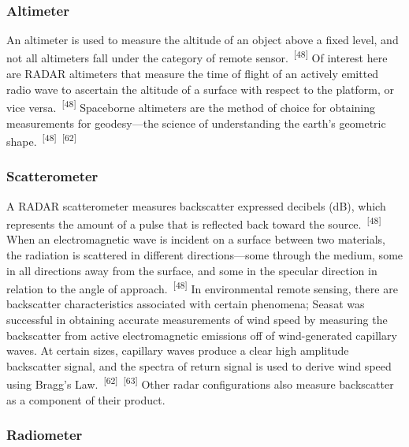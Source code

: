\documentclass{article}
\begin{document}
\subsubsection{Altimeter}


\par{An altimeter is used to measure the altitude of an object above a fixed level, and not all altimeters fall under the category of remote sensor.~\textsuperscript{[48]} Of interest here are RADAR altimeters that measure the time of flight of an actively emitted radio wave to ascertain the altitude of a surface with respect to the platform, or vice versa.~\textsuperscript{[48]} Spaceborne altimeters are the method of choice for obtaining measurements for geodesy---the science of understanding the earth's geometric shape.~\textsuperscript{[48]}~\textsuperscript{[62]}}

\subsubsection{Scatterometer}


\par{A RADAR scatterometer measures backscatter expressed decibels (dB), which represents the amount of a pulse that is reflected back toward the source.~\textsuperscript{[48]}  When an electromagnetic wave is incident on a surface between two materials, the radiation is scattered in different directions---some through the medium, some in all directions away from the surface, and some in the specular direction in relation to the angle of approach.~\textsuperscript{[48]} In environmental remote sensing, there are backscatter characteristics associated with certain phenomena; Seasat was successful in obtaining accurate measurements of wind speed by measuring the backscatter from active electromagnetic emissions off of wind-generated capillary waves. At certain sizes, capillary waves produce a clear high amplitude backscatter signal, and the spectra of return signal is used to derive wind speed using Bragg's Law.~\textsuperscript{[62]}~\textsuperscript{[63]} Other radar configurations also measure backscatter as a component of their product.}

\subsubsection{Radiometer}
\end{document}
